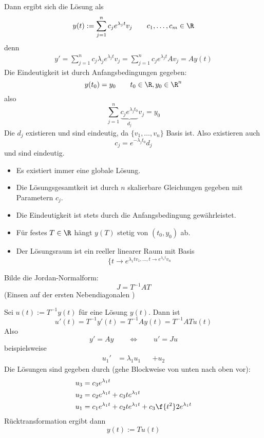 \documentclass[a4paper,10pt]{scrbook}
\begin{document}
\begin{seg}[Fall 1: ${v_1,\dotsc, v_n}$ bildet eine Basis aus Eigenvektoren: $Av_j = \lambda_j v_j$]
	Dann ergibt sich die Lösung als
	\[
		y(t) := \sum_{j=1}^n c_j e^{\lambda_j t} v_j
		\qquad c_1,\dotsc, c_m \in \R
	\]
	denn
	\begin{align*}
		y' = \sum_{j=1}^n c_j \lambda_j e^{\lambda_j t} v_j = \sum_{j=1}^n c_j e^{\lambda_j t} Av_j = A y(t)
	\end{align*}
	Die Eindeutigkeit ist durch Anfangsbedingungen gegeben:
	\[
		y(t_0) = y_0
		\qquad t_0 \in \R, y_0 \in \R^n
	\]
	also
	\[
		\sum_{j=1}^n \underbrace{c_j e^{\lambda_j t_0}}_{d_j} v_j = y_0
	\]
	Die $d_j$ existieren und sind eindeutig, da $\{v_1,\dotsc,v_n\}$ Basis ist.
	Also existieren auch
	\[
		c_j  = e^{-\lambda_j t_0} d_j
	\]
	und sind eindeutig.

	\begin{note}[Beobachtungen]
		\begin{itemize}
			\item
				Es existiert immer eine globale Lösung.
			\item
				Die Lösungsgesamtkeit ist durch $n$ skalierbare Gleichungen gegeben mit Parametern $c_j$.
			\item
				Die Eindeutigkeit ist stets durch die Anfangsbedingung gewährleistet.
			\item
				Für festes $T \in \R$ hängt $y(T)$ stetig von $(t_0, y_0)$ ab.
			\item
				Der Lösungsraum ist ein reeller linearer Raum mit Basis
				\[
					\{ t \to e^{\lambda_1 t v_1, \dotsc, t\to e^{\lambda_n t}v_n}
				\]
		\end{itemize}
	\end{note}
\end{seg}

\begin{seg}
	Bilde die Jordan-Normalform:
	\[
		J = T^{-1} A T
	\]
	(Einsen auf der ersten Nebendiagonalen \fixme[Beispielmatrix])

	Sei $u(t) := T^{-1} y(t)$ für eine Lösung $y(t)$.
	Dann ist
	\[
		u'(t) = T^{-1}y'(t) = T^{-1}Ay(t) = T^{-1}AT u(t)
	\]
	Also
	\[
		y' = Ay
		\qquad \iff \qquad
		u' = Ju
	\]
	beispielsweise	\fixme[Jordansystem]
	\begin{align*}
		u_1' &= \lambda_1 u_1& &+ u_2
	\end{align*}
	Die Lösungen sind gegeben durch (gehe Blockweise von unten nach oben vor):
	\begin{align*}
		u_3 &= c_3 e^{\lambda_1 t} \\
		u_2 &= c_2 e^{\lambda_1 t} + c_3 t e^{\lambda_1 t} \\
		u_1 &= c_1 e^{\lambda_1 t} + c_2 t e^{\lambda_1 t} + c_3 \f {t^2}2 e^{\lambda_1 t} \\
	\end{align*}
	Rücktransformation ergibt dann
	\[
		y(t) := T u(t)
	\]
\end{seg}
\end{document}
